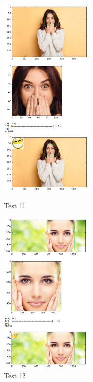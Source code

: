 \begin{frame}
\begin{figure}[!htbp]
\begin{multicols}{2}
        \includegraphics[angle=0,width=46mm]{Imagenes/test11.png}
                   \caption{Test 11}
                   \label{fig:test11} 
                   
     \includegraphics[angle=0,width=46mm]{Imagenes/test12.png}
                \caption{Test 12}
                \label{fig:test12}    
    \end{multicols}
        
\end{figure}
\end{frame}



